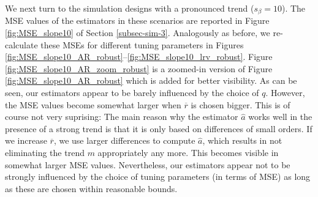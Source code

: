 We next turn to the simulation designs with a pronounced trend ($s_\beta = 10$). The MSE values of the estimators in these scenarios are reported in Figure \ref{fig:MSE_slope10} of Section \ref{subsec-sim-3}. Analogously as before, we re-calculate these MSEs for different tuning parameters in Figures \ref{fig:MSE_slope10_AR_robust}--\ref{fig:MSE_slope10_lrv_robust}. Figure \ref{fig:MSE_slope10_AR_zoom_robust} is a zoomed-in version of Figure \ref{fig:MSE_slope10_AR_robust} which is added for better visibility. As can be seen, our estimators appear to be barely influenced by the choice of $q$. However, the MSE values become somewhat larger when $\overline{r}$ is chosen bigger. This is of course not very suprising: The main reason why the estimator $\widehat{a}$ works well in the presence of a strong trend is that it is only based on differences of small orders. If we increase $\overline{r}$, we use larger differences to compute $\widehat{a}$, which results in not eliminating the trend $m$ appropriately any more. This becomes visible in somewhat larger MSE values. Nevertheless, our estimators appear not to be strongly influenced by the choice of tuning parameters (in terms of MSE) as long as these are chosen within reasonable bounds. 



